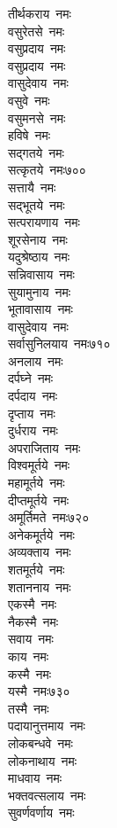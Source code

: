 \begin{multicols}{2}
\begin{flushleft}
तीर्थकराय~नमः\\
वसुरेतसे~नमः\\
वसुप्रदाय~नमः\\
वसुप्रदाय~नमः\\
वासुदेवाय~नमः\\
वसुवे~नमः\\
वसुमनसे~नमः\\
हविषे~नमः\\
सद्गतये~नमः\\
सत्कृतये~नमः\hfill ७००\\
सत्तायै~नमः\\
सद्भूतये~नमः\\
सत्परायणाय~नमः\\
शूरसेनाय~नमः\\
यदुश्रेष्ठाय~नमः\\
सन्निवासाय~नमः\\
सुयामुनाय~नमः\\
भूतावासाय~नमः\\
वासुदेवाय~नमः\\
सर्वासुनिलयाय~नमः\hfill ७१०\\
अनलाय~नमः\\
दर्पघ्ने~नमः\\
दर्पदाय~नमः\\
दृप्ताय~नमः\\
दुर्धराय~नमः\\
अपराजिताय~नमः\\
विश्वमूर्तये~नमः\\
महामूर्तये~नमः\\
दीप्तमूर्तये~नमः\\
अमूर्तिमते~नमः\hfill ७२०\\
अनेकमूर्तये~नमः\\
अव्यक्ताय~नमः\\
शतमूर्तये~नमः\\
शताननाय~नमः\\
एकस्मै~नमः\\
नैकस्मै~नमः\\
सवाय~नमः\\
काय~नमः\\
कस्मै~नमः\\
यस्मै~नमः\hfill ७३०\\
तस्मै~नमः\\
पदायानुत्तमाय~नमः\\
लोकबन्धवे~नमः\\
लोकनाथाय~नमः\\
माधवाय~नमः\\
भक्तवत्सलाय~नमः\\
सुवर्णवर्णाय~नमः\\

\end{flushleft}
\end{multicols}
